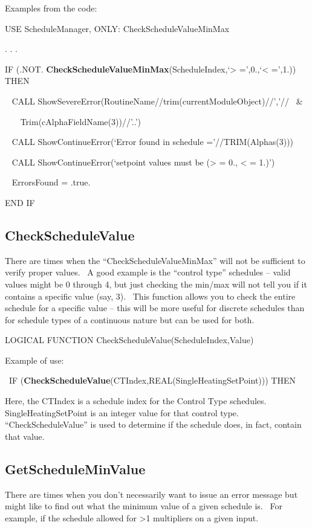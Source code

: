 Examples from the code:

USE ScheduleManager, ONLY: CheckScheduleValueMinMax

. . .

IF (.NOT. \textbf{CheckScheduleValueMinMax}(ScheduleIndex,`\textgreater{} =',0.,`\textless{} =',1.)) THEN

~ CALL ShowSevereError(RoutineName//trim(currentModuleObject)//','//~ \&

~~~ Trim(cAlphaFieldName(3))//'..')

~ CALL ShowContinueError(`Error found in schedule ='//TRIM(Alphas(3)))

~ CALL ShowContinueError(`setpoint values must be (\textgreater{} = 0., \textless{} = 1.)')

~ ErrorsFound = .true.

END IF

\subsection{CheckScheduleValue}\label{checkschedulevalue}

There are times when the ``CheckScheduleValueMinMax'' will not be sufficient to verify proper values.~ A good example is the ``control type'' schedules -- valid values might be 0 through 4, but just checking the min/max will not tell you if it contains a specific value (say, 3).~ This function allows you to check the entire schedule for a specific value -- this will be more useful for discrete schedules than for schedule types of a continuous nature but can be used for both.

LOGICAL FUNCTION CheckScheduleValue(ScheduleIndex,Value)

Example of use:

~IF (\textbf{CheckScheduleValue}(CTIndex,REAL(SingleHeatingSetPoint))) THEN

Here, the CTIndex is a schedule index for the Control Type schedules.~ SingleHeatingSetPoint is an integer value for that control type.~ ``CheckScheduleValue'' is used to determine if the schedule does, in fact, contain that value.

\subsection{GetScheduleMinValue}\label{getscheduleminvalue}

There are times when you don't necessarily want to issue an error message but might like to find out what the minimum value of a given schedule is.~ For example, if the schedule allowed for \textgreater{}1 multipliers on a given input.

